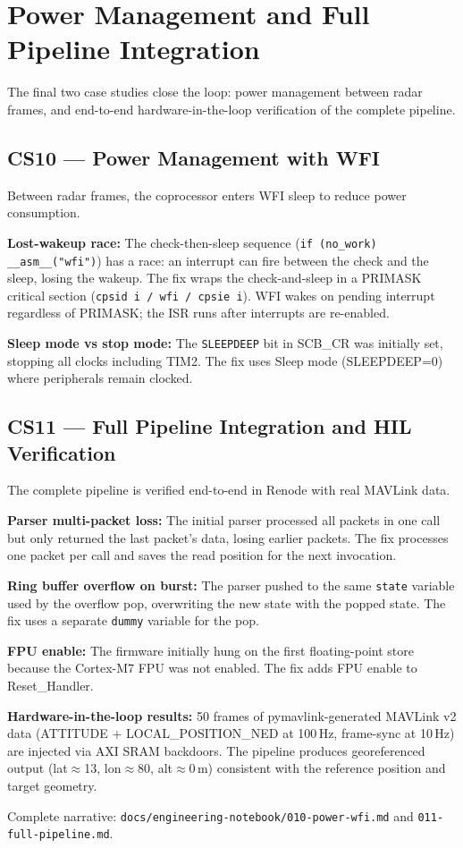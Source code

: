 \section{Power Management and Full Pipeline Integration}
\label{sec:cs10-11}

The final two case studies close the loop: power management between radar frames, and end-to-end hardware-in-the-loop verification of the complete pipeline.

\subsection{CS10 --- Power Management with WFI}

Between radar frames, the coprocessor enters WFI sleep to reduce power consumption.

\textbf{Lost-wakeup race:} The check-then-sleep sequence (\texttt{if (no\_work) \_\_asm\_\_("wfi")}) has a race: an interrupt can fire between the check and the sleep, losing the wakeup. The fix wraps the check-and-sleep in a PRIMASK critical section (\texttt{cpsid i / wfi / cpsie i}). WFI wakes on pending interrupt regardless of PRIMASK; the ISR runs after interrupts are re-enabled.

\textbf{Sleep mode vs stop mode:} The \texttt{SLEEPDEEP} bit in SCB\_CR was initially set, stopping all clocks including TIM2. The fix uses Sleep mode (SLEEPDEEP=0) where peripherals remain clocked.

\subsection{CS11 --- Full Pipeline Integration and HIL Verification}

The complete pipeline is verified end-to-end in Renode with real MAVLink data.

\textbf{Parser multi-packet loss:} The initial parser processed all packets in one call but only returned the last packet's data, losing earlier packets. The fix processes one packet per call and saves the read position for the next invocation.

\textbf{Ring buffer overflow on burst:} The parser pushed to the same \texttt{state} variable used by the overflow pop, overwriting the new state with the popped state. The fix uses a separate \texttt{dummy} variable for the pop.

\textbf{FPU enable:} The firmware initially hung on the first floating-point store because the Cortex-M7 FPU was not enabled. The fix adds FPU enable to Reset\_Handler.

\textbf{Hardware-in-the-loop results:} 50 frames of pymavlink-generated MAVLink v2 data (ATTITUDE + LOCAL\_POSITION\_NED at 100\,Hz, frame-sync at 10\,Hz) are injected via AXI SRAM backdoors. The pipeline produces georeferenced output (lat$\approx$13, lon$\approx$80, alt$\approx$0\,m) consistent with the reference position and target geometry.

Complete narrative: \texttt{docs/engineering-notebook/010-power-wfi.md} and \texttt{011-full-pipeline.md}.